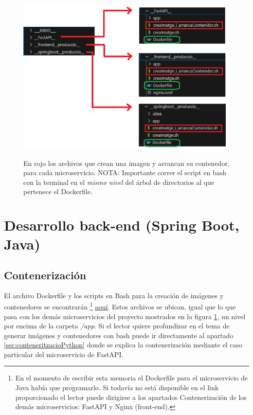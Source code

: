 \documentclass[a4paper,12pt]{report}
\begin{document}
				
				\FloatBarrier
				\setlength{\belowcaptionskip}{3pt}
				\begin{figure}[H]
					\centering
					\caption{En rojo los archivos que crean una imagen y arrancan su contenedor, para cada microservicio. NOTA: Importante correr el script en bash con la terminal en el \textit{mismo nivel} del árbol de directorios al que pertenece el Dockerfile.}
					\includegraphics[width=.7\linewidth]{img/dockeritzacioAplicacioPlantilla.png}
					\label{fig:dockeritzacioAplicacioPlantilla}
				\end{figure}
				\FloatBarrier
				
			

			
			\section{Desarrollo back-end (Spring Boot, Java)}
			\label{sec:parteSpringBoot}
			
				\subsection{Contenerización}
				
				El archivo Dockerfile y los scripts en Bash para la creación de imágenes y contenedores se encontrarán \footnote{En el momento de escribir esta memoria el Dockerfile para el microservicio de Java había que programarlo. Si todavía no está disponible en el link proporcionado el lector puede dirigirse a los apartados Contenerización de los demás microservicios: FastAPI y Nginx (front-end).} \href{https://github.com/blackcub3s/mercApp/tree/main/APP%20WEB/__springboot__produccio__}{aquí}. Estos archivos se ubican, igual que lo que pasa con los demás microservicios del proyecto mostrados en la figura \ref{fig:dockeritzacioAplicacioPlantilla}, un nivel por encima de la carpeta \textit{/app}. Si el lector quiere profundizar en el tema de generar imágenes y contenedores con bash puede ir directamente al apartado \ref{sec:conteneritzacioPython} donde se explica la contenerización mediante el caso particular del microservicio de FastAPI.
			
\end{document}
